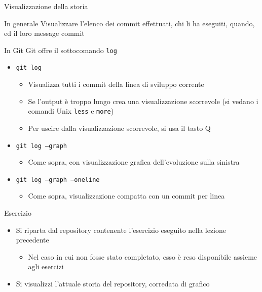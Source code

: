 \documentclass[xcolor=dvipsnames,presentation]{beamer}
\begin{document}
\begin{frame}{Visualizzazione della storia}
    \begin{block}{In generale}
        Visualizzare l'elenco dei commit effettuati, chi li ha eseguiti, quando, ed il loro message commit
    \end{block}
    \begin{block}{In Git}
        Git offre il sottocomando \texttt{log}
        \begin{itemize}
            \item \texttt{git log}
            \begin{itemize}
                \item Visualizza tutti i commit della linea di sviluppo corrente
                \item Se l'output è troppo lungo crea una visualizzazione scorrevole (si vedano i comandi Unix \texttt{less} e \texttt{more})
                \item Per uscire dalla visualizzazione scorrevole, si usa il tasto Q
            \end{itemize}
            \item \texttt{git log --graph}
            \begin{itemize}
                \item Come sopra, con visualizzazione grafica dell'evoluzione sulla sinistra
            \end{itemize}
            \item \texttt{git log --graph --oneline}
            \begin{itemize}
                \item Come sopra, visualizzazione compatta con un commit per linea
            \end{itemize}
        \end{itemize}
    \end{block}
    \begin{block}{Esercizio}
        \begin{itemize}
            \item Si riparta dal repository contenente l'esercizio eseguito nella lezione precedente
            \begin{itemize}
                \item Nel caso in cui non fosse stato completato, esso è reso disponibile assieme
agli esercizi
            \end{itemize}
            \item Si visualizzi l'attuale storia del repository, corredata di grafico

\end{itemize}
\end{block}
\end{frame}
\end{document}
